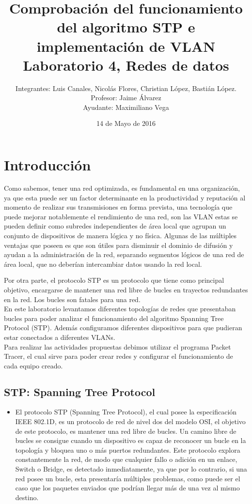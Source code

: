 \documentclass[spanish]{udpreport}
\title{Comprobación del funcionamiento del algoritmo STP e implementación de VLAN\\Laboratorio 4, Redes de datos}
\author{Integrantes: Luis Canales, Nicolás Flores, Christian López, Bastián López.\\Profesor: Jaime Álvarez \\ Ayudante: Maximiliano Vega}
\date{14 de Mayo de 2016}
\begin{document}
\maketitle

\tableofcontents

\chapter{Introducción}
Como sabemos, tener una red optimizada, es fundamental en una organización, ya que esta puede ser un factor determinante en la productividad y reputación al momento de realizar sus transmisiones en forma prevista, una tecnología que puede mejorar notablemente el rendimiento de una red, son las VLAN  estas se pueden definir como subredes independientes de área local que agrupan un conjunto de dispositivos de manera lógica y no física. Algunas de las múltiples ventajas que poseen es que son útiles para disminuir el dominio de difusión y ayudan a la administración de la red, separando segmentos lógicos de una red de área local, que no deberían intercambiar datos usando la red local.

Por otra parte, el protocolo STP es un protocolo que tiene como principal objetivo, encargarse de mantener una red libre de bucles en trayectos redundantes en la red. Los bucles son fatales para una red.\\
En este laboratorio levantamos diferentes topologías de redes que presentaban bucles para poder analizar el funcionamiento del algoritmo Spanning Tree Protocol (STP). Además configuramos diferentes dispositivos para que pudieran estar conectados a diferentes VLANs.\\
Para realizar las actividades propuestas debimos utilizar el programa Packet Tracer, el cual sirve para poder crear redes y configurar el funcionamiento de cada equipo creado. \\


\section{STP: Spanning Tree Protocol}
\begin{itemize}
\item
El protocolo STP (Spanning Tree Protocol), el cual posee la especificación IEEE 802.1D, es un protocolo de red de nivel dos del modelo OSI, el objetivo de este protocolo, es mantener una red libre de bucles. Un camino libre de bucles se consigue cuando un dispositivo es capaz de reconocer un bucle en la topología y bloquea uno o más puertos redundantes. Este protocolo explora constantemente la red, de modo que cualquier fallo o adición en un enlace, Switch o Bridge, es detectado inmediatamente, ya que por lo contrario, si una red posee un bucle, esta presentaría múltiples problemas, como puede ser el caso que los paquetes enviados que podrían llegar más de una vez al mismo destino.


\end{itemize}
\end{document}
